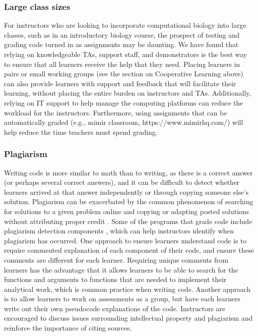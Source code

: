\subsubsection{Large class sizes}

For instructors who are looking to incorporate computational biology into large classes, such as in an introductory biology course, the prospect of testing and grading code turned in as assignments may be daunting. 
We have found that relying on knowledgeable TAs, support staff, and demonstrators is the best way to ensure that all learners receive the help that they need.
Placing learners in pairs or small working groups (see the section on Cooperative Learning above) can also provide learners with support and feedback that will facilitate their learning, without placing the entire burden on instructors and TAs.
Additionally, relying on IT support to help manage the computing platforms can reduce the workload for the instructors.
Furthermore, using assignments that can be automatically graded (e.g., mimir classroom, https://www.mimirhq.com/) will help reduce the time teachers must spend grading.



\subsubsection{Plagiarism}
Writing code is more similar to math than to writing, as there is a correct answer (or perhaps several correct answers), and it can be difficult to detect whether learners arrived at that answer independently or through copying someone else's solution.
Plagiarism can be exacerbated by the common phenomenon of searching for solutions to a given problem online and copying or adapting posted solutions without attributing proper credit \citep{gaspar_restoring_2007}. 
Some of the programs that grade code include plagiarism detection components \citep{pears_survey_2007}, which can help instructors identify when plagiarism has occurred.
One approach to ensure learners understand code is to require commented explanation of each component of their code, and ensure these comments are different for each learner.
Requiring unique comments from learners has the advantage that it allows learners to be able to search for the functions and arguments to functions that are needed to implement their analytical work,
which is common practice when writing code.
Another approach is to allow learners to work on assessments as a group, but have each learners write out their own pseudocode explanations of the code.
Instructors are encouraged to discuss issues surrounding intellectual property and plagiarism and reinforce the importance of citing sources.

